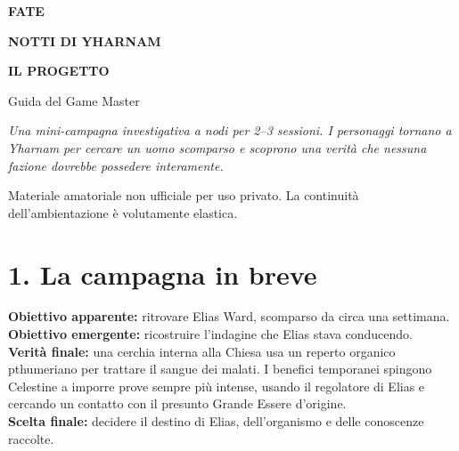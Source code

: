 \documentclass[11pt,a4paper]{article}
\begin{document}
\begin{titlepage}
\thispagestyle{empty}
\vspace*{31mm}
\begin{center}
{\displayfont\fontsize{32}{37}\selectfont\bfseries FATE}\par
\vspace{2mm}
{\displayfont\fontsize{23}{28}\selectfont\bfseries NOTTI DI YHARNAM}\par
\vspace{6mm}
{\displayfont\fontsize{18}{22}\selectfont\color{blood}\bfseries IL PROGETTO}\par
\vspace{13mm}
{\large Guida del Game Master}\par
\vspace{20mm}
\begin{minipage}{.72\textwidth}
\centering\itshape
Una mini-campagna investigativa a nodi per 2--3 sessioni. I personaggi tornano a Yharnam per cercare un uomo scomparso e scoprono una verità che nessuna fazione dovrebbe possedere interamente.
\end{minipage}
\vfill
{\small Materiale amatoriale non ufficiale per uso privato. La continuità dell'ambientazione è volutamente elastica.}
\end{center}
\end{titlepage}

\tableofcontents
\clearpage

\section{1. La campagna in breve}

\begin{bloodbox}
\textbf{Obiettivo apparente:} ritrovare Elias Ward, scomparso da circa una settimana.\\
\textbf{Obiettivo emergente:} ricostruire l'indagine che Elias stava conducendo.\\
\textbf{Verità finale:} una cerchia interna alla Chiesa usa un reperto organico pthumeriano per trattare il sangue dei malati. I benefici temporanei spingono Celestine a imporre prove sempre più intense, usando il regolatore di Elias e cercando un contatto con il presunto Grande Essere d'origine.\\
\textbf{Scelta finale:} decidere il destino di Elias, dell'organismo e delle conoscenze raccolte.
\end{bloodbox}
\end{document}
